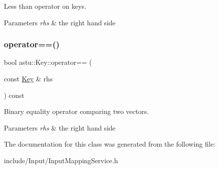Less than operator on keys.


\begin{DoxyParams}{Parameters}
{\em rhs} & the right hand side \\
\hline
\end{DoxyParams}
\mbox{\label{classastu_1_1Key_a7955f202afbf7e947639fc2553b6db53}} 
\subsubsection{\texorpdfstring{operator==()}{operator==()}}
{\footnotesize\ttfamily bool astu\+::\+Key\+::operator== (\begin{DoxyParamCaption}\item[{const \hyperlink{classastu_1_1Key}{Key} \&}]{rhs }\end{DoxyParamCaption}) const\hspace{0.3cm}{\ttfamily [inline]}}

Binary equality operator comparing two vectors.


\begin{DoxyParams}{Parameters}
{\em rhs} & the right hand side \\
\hline
\end{DoxyParams}


The documentation for this class was generated from the following file\+:\begin{DoxyCompactItemize}
\item 
include/\+Input/Input\+Mapping\+Service.\+h\end{DoxyCompactItemize}
